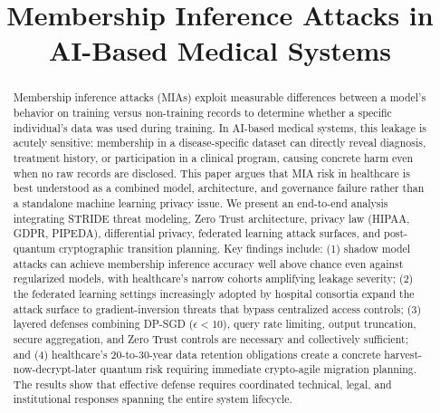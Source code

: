\documentclass[conference]{IEEEtran}
\begin{document}
	\title{Membership Inference Attacks in AI-Based Medical Systems}

	\author{
	}

	\maketitle

	\begin{abstract}
		Membership inference attacks (MIAs) exploit measurable differences between a model's behavior on training versus non-training records to determine whether a specific individual's data was used during training. In AI-based medical systems, this leakage is acutely sensitive: membership in a disease-specific dataset can directly reveal diagnosis, treatment history, or participation in a clinical program, causing concrete harm even when no raw records are disclosed. This paper argues that MIA risk in healthcare is best understood as a combined model, architecture, and governance failure rather than a standalone machine learning privacy issue. We present an end-to-end analysis integrating STRIDE threat modeling, Zero Trust architecture, privacy law (HIPAA, GDPR, PIPEDA), differential privacy, federated learning attack surfaces, and post-quantum cryptographic transition planning. Key findings include: (1) shadow model attacks can achieve membership inference accuracy well above chance even against regularized models, with healthcare's narrow cohorts amplifying leakage severity; (2) the federated learning settings increasingly adopted by hospital consortia expand the attack surface to gradient-inversion threats that bypass centralized access controls; (3) layered defenses combining DP-SGD ($\epsilon < 10$), query rate limiting, output truncation, secure aggregation, and Zero Trust controls are necessary and collectively sufficient; and (4) healthcare's 20-to-30-year data retention obligations create a concrete harvest-now-decrypt-later quantum risk requiring immediate crypto-agile migration planning. The results show that effective defense requires coordinated technical, legal, and institutional responses spanning the entire system lifecycle.
	\end{abstract}
\end{document}
